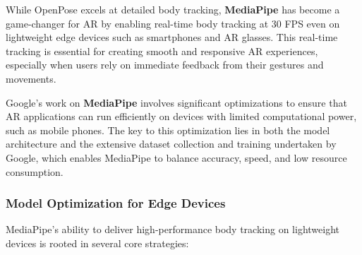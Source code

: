 While OpenPose excels at detailed body tracking, \textbf{MediaPipe} has become a game-changer for AR by enabling real-time body tracking at 30 FPS even on lightweight edge devices such as smartphones and AR glasses.
This real-time tracking is essential for creating smooth and responsive AR experiences, especially when users rely on immediate feedback from their gestures and movements.

Google’s work on \textbf{MediaPipe} involves significant optimizations to ensure that AR applications can run efficiently on devices with limited computational power, such as mobile phones.
The key to this optimization lies in both the model architecture and the extensive dataset collection and training undertaken by Google, which enables MediaPipe to balance accuracy, speed, and low resource consumption.

\subsubsection{ Model Optimization for Edge Devices}

MediaPipe's ability to deliver high-performance body tracking on lightweight devices is rooted in several core strategies:


